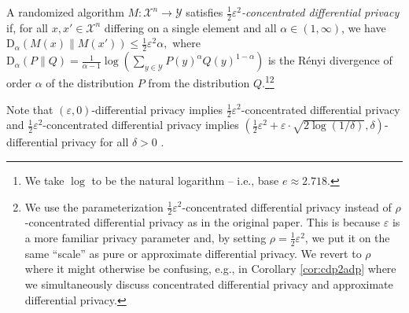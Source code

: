 \documentclass{jpc}
\newcommand{\dr}[3]{\mathrm{D}_{#1}\left(#2\middle\|#3\right)}
\newcommand{\eps}{\varepsilon}
\begin{document}
\begin{defi}\label{defn:cdp}
A randomized algorithm $M\colon \mathcal{X}^n \to \mathcal{Y}$ satisfies \emph{$\frac12 \eps^2$-concentrated differential privacy} if, for all $x,x' \in \mathcal{X}^n$ differing on a single element and all $\alpha \in (1,\infty)$, we have $\dr{\alpha}{M(x)}{M(x')} \le \frac12 \eps^2  \alpha,$ where $\dr{\alpha}{P}{Q} = \frac{1}{\alpha-1} \log\left(\sum_{y \in \mathcal{Y}} P(y)^\alpha Q(y)^{1-\alpha}\right)$ is the R\'enyi divergence of order $\alpha$ of the distribution $P$ from the distribution $Q$.\footnote{We take $\log$ to be the natural logarithm -- i.e., base $e \approx 2.718$.}\footnote{We use the parameterization $\frac12\eps^2$-concentrated differential privacy instead of $\rho$-concentrated differential privacy as in the original paper. This is because $\eps$ is a more familiar privacy parameter and, by setting $\rho = \frac12\eps^2$, we put it on the same ``scale'' as pure or approximate differential privacy. We revert to $\rho$ where it might otherwise be confusing, e.g., in Corollary \ref{cor:cdp2adp} where we simultaneously discuss concentrated differential privacy and approximate differential privacy.}
\end{defi}

Note that $(\eps,0)$-differential privacy implies $\frac12 \eps^2$-concentrated differential privacy and $\frac12 \eps^2$-concentrated differential privacy implies $\left(\frac12 \eps^2 + \eps \cdot \sqrt{2\log(1/\delta)},\delta\right)$-differential privacy for all $\delta>0$ \citep{BunS16}.
\end{document}
